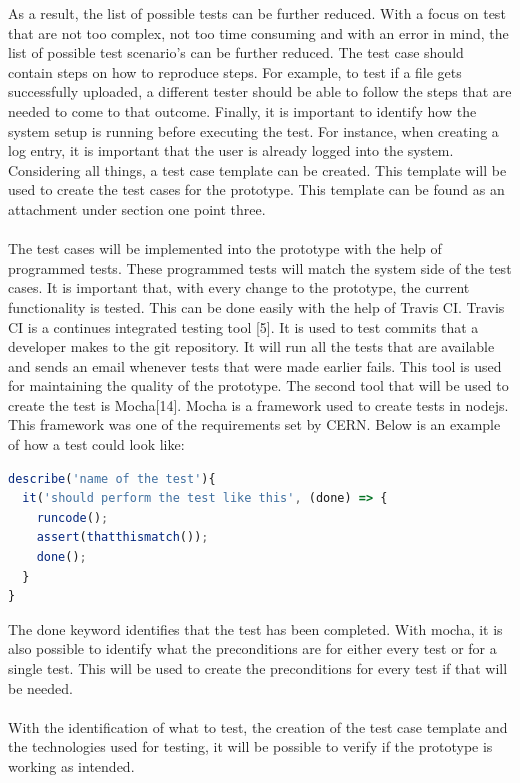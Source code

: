 \documentclass[paper=a4, fontsize=11pt,twoside]{scrartcl}	%
\begin{document}
As a result, the list of possible tests can be further reduced. With a focus on test that are not too complex, not too time consuming and with an error in mind, the list of possible test scenario's can be further reduced.  The test case should contain steps on how to reproduce steps. For example, to test if a file gets successfully uploaded, a different tester should be able to follow the steps that are needed to come to that outcome. Finally, it is important to identify how the system setup is running before executing the test. For instance, when creating a log entry, it is important that the user is already logged into the system. Considering all things, a test case template can be created. This template will be used to create the test cases for the prototype. This template can be found as an attachment under section one point three. \\ \\
The test cases will be implemented into the prototype with the help of programmed tests. These programmed tests will match the system side of the test cases. It is important that, with every change to the prototype, the current functionality is tested. This can be done easily with the help of Travis CI. Travis CI is a continues integrated testing tool [5]. It is used to test commits that a developer makes to the git repository. It will run all the tests that are available and sends an email whenever tests that were made earlier fails. This tool is used for maintaining the quality of the prototype. The second tool that will be used to create the test is Mocha[14]. Mocha is a framework used to create tests in nodejs. This framework was one of the requirements set by CERN. Below is an example of how a test could look like:
\begin{lstlisting}[language=JavaScript, frame=single]
describe('name of the test'){
  it('should perform the test like this', (done) => {
    runcode();
    assert(thatthismatch());
    done();
  }
}
\end{lstlisting} 
The done keyword identifies that the test has been completed. With mocha, it is also possible to identify what the preconditions are for either every test or for a single test. This will be used to create the preconditions for every test if that will be needed.\\ \\
With the identification of what to test, the creation of the test case template and the technologies used for testing, it will be possible to verify if the prototype is working as intended.
\newpage
\end{document}
